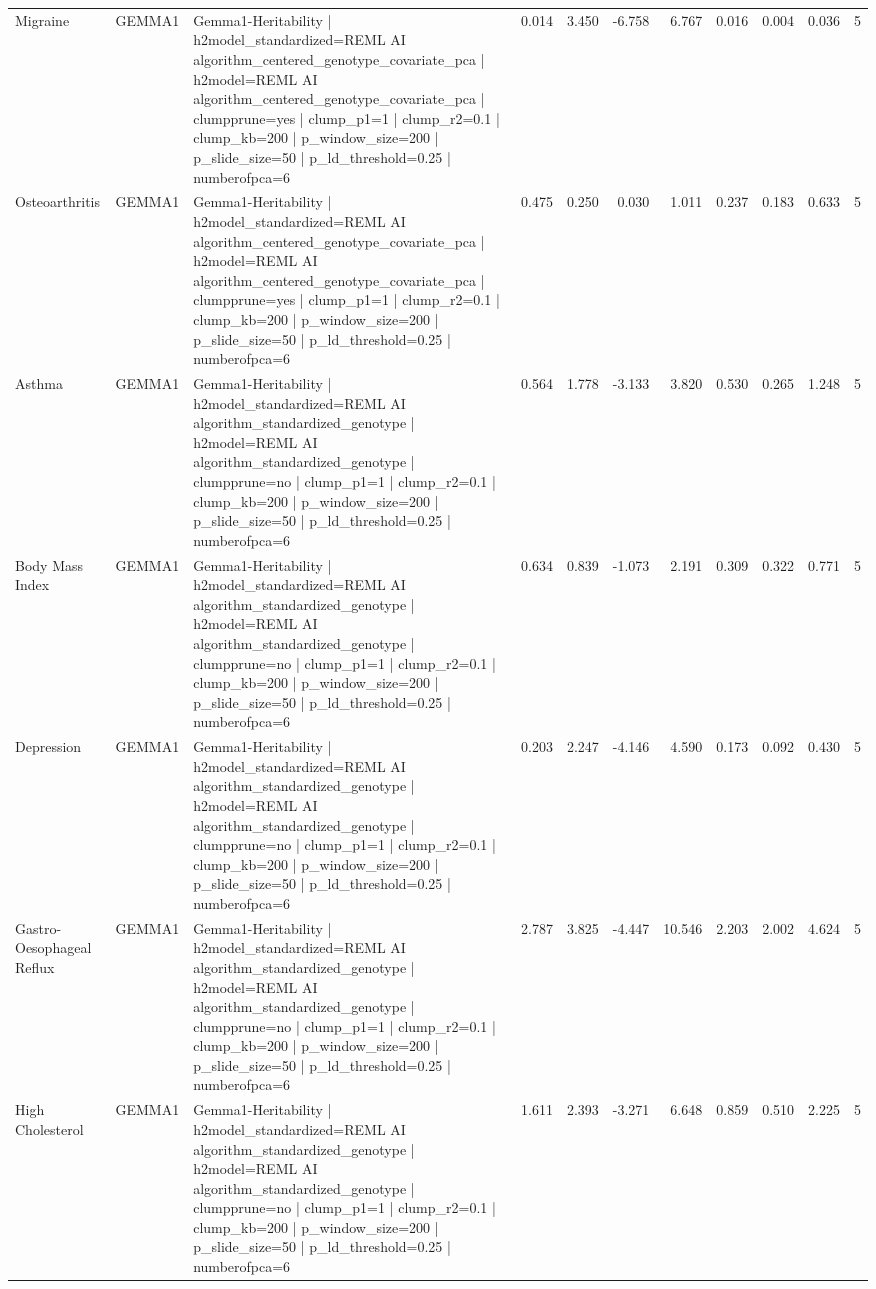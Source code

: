 \begin{landscape}
\begin{longtable}{p{2.4cm}p{1.8cm}p{6.0cm}rrrrrrrr}
Migraine & GEMMA1 & Gemma1-Heritability | h2model\_standardized=REML AI algorithm\_centered\_genotype\_covariate\_pca | h2model=REML AI algorithm\_centered\_genotype\_covariate\_pca | clumpprune=yes | clump\_p1=1 | clump\_r2=0.1 | clump\_kb=200 | p\_window\_size=200 | p\_slide\_size=50 | p\_ld\_threshold=0.25 | numberofpca=6 & 0.014 & 3.450 & -6.758 & 6.767 & 0.016 & 0.004 & 0.036 & 5 \\
Osteoarthritis & GEMMA1 & Gemma1-Heritability | h2model\_standardized=REML AI algorithm\_centered\_genotype\_covariate\_pca | h2model=REML AI algorithm\_centered\_genotype\_covariate\_pca | clumpprune=yes | clump\_p1=1 | clump\_r2=0.1 | clump\_kb=200 | p\_window\_size=200 | p\_slide\_size=50 | p\_ld\_threshold=0.25 | numberofpca=6 & 0.475 & 0.250 & 0.030 & 1.011 & 0.237 & 0.183 & 0.633 & 5 \\
Asthma & GEMMA1 & Gemma1-Heritability | h2model\_standardized=REML AI algorithm\_standardized\_genotype | h2model=REML AI algorithm\_standardized\_genotype | clumpprune=no | clump\_p1=1 | clump\_r2=0.1 | clump\_kb=200 | p\_window\_size=200 | p\_slide\_size=50 | p\_ld\_threshold=0.25 | numberofpca=6 & 0.564 & 1.778 & -3.133 & 3.820 & 0.530 & 0.265 & 1.248 & 5 \\
Body Mass Index & GEMMA1 & Gemma1-Heritability | h2model\_standardized=REML AI algorithm\_standardized\_genotype | h2model=REML AI algorithm\_standardized\_genotype | clumpprune=no | clump\_p1=1 | clump\_r2=0.1 | clump\_kb=200 | p\_window\_size=200 | p\_slide\_size=50 | p\_ld\_threshold=0.25 | numberofpca=6 & 0.634 & 0.839 & -1.073 & 2.191 & 0.309 & 0.322 & 0.771 & 5 \\
Depression & GEMMA1 & Gemma1-Heritability | h2model\_standardized=REML AI algorithm\_standardized\_genotype | h2model=REML AI algorithm\_standardized\_genotype | clumpprune=no | clump\_p1=1 | clump\_r2=0.1 | clump\_kb=200 | p\_window\_size=200 | p\_slide\_size=50 | p\_ld\_threshold=0.25 | numberofpca=6 & 0.203 & 2.247 & -4.146 & 4.590 & 0.173 & 0.092 & 0.430 & 5 \\
Gastro-Oesophageal Reflux & GEMMA1 & Gemma1-Heritability | h2model\_standardized=REML AI algorithm\_standardized\_genotype | h2model=REML AI algorithm\_standardized\_genotype | clumpprune=no | clump\_p1=1 | clump\_r2=0.1 | clump\_kb=200 | p\_window\_size=200 | p\_slide\_size=50 | p\_ld\_threshold=0.25 | numberofpca=6 & 2.787 & 3.825 & -4.447 & 10.546 & 2.203 & 2.002 & 4.624 & 5 \\
High Cholesterol & GEMMA1 & Gemma1-Heritability | h2model\_standardized=REML AI algorithm\_standardized\_genotype | h2model=REML AI algorithm\_standardized\_genotype | clumpprune=no | clump\_p1=1 | clump\_r2=0.1 | clump\_kb=200 | p\_window\_size=200 | p\_slide\_size=50 | p\_ld\_threshold=0.25 | numberofpca=6 & 1.611 & 2.393 & -3.271 & 6.648 & 0.859 & 0.510 & 2.225 & 5 \\

\end{longtable}
\end{landscape}
